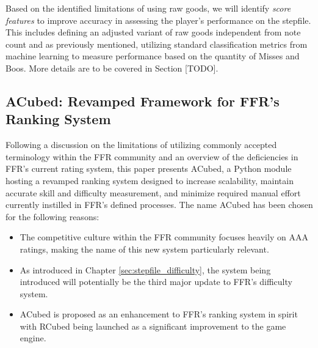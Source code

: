 \vspace{2mm}

Based on the identified limitations of using raw goods, we will identify \textit{score features} to improve accuracy in assessing the player's performance on the stepfile. This includes defining an adjusted variant of raw goods independent from note count and as previously mentioned, utilizing standard classification metrics from machine learning to measure performance based on the quantity of Misses and Boos. More details are to be covered in Section [TODO].

\subsection{ACubed: Revamped Framework for FFR's Ranking System}

Following a discussion on the limitations of utilizing commonly accepted terminology within the FFR community and an overview of the deficiencies in FFR's current rating system, this paper presents ACubed, a Python module hosting a revamped ranking system designed to increase scalability, maintain accurate skill and difficulty measurement, and minimize required manual effort currently instilled in FFR's defined processes. The name ACubed has been chosen for the following reasons:

\begin{itemize}
	\item The competitive culture within the FFR community focuses heavily on AAA ratings, making the name of this new system particularly relevant.
	\item As introduced in Chapter \ref{sec:stepfile_difficulty}, the system being introduced will potentially be the third major update to FFR's difficulty system.
	\item ACubed is proposed as an enhancement to FFR's ranking system in spirit with RCubed being launched as a significant improvement to the game engine.
\end{itemize}

